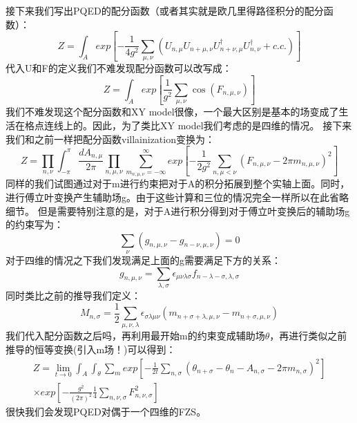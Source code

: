 \documentclass{article}
\begin{document}
接下来我们写出PQED的配分函数（或者其实就是欧几里得路径积分的配分函数）：
\begin{equation}
    Z = \int_A exp\left[ - \frac{1}{4 g^2} \sum_{\mu,\nu} \left(U_{n,\mu}U_{n+\mu,\nu}U_{n+\nu,\mu}^{\dagger} U_{n,\nu}^{\dagger} +c.c.\right)   \right] 
\end{equation}
代入U和F的定义我们不难发现配分函数可以改写成：
\begin{equation}
    Z = \int_A exp\left[ \frac{1}{g^2} \sum_{\mu,\nu} \cos(F_{n,\mu,\nu})  \right] 
\end{equation}
我们不难发现这个配分函数和XY model很像，一个最大区别是基本的场变成了生活在格点连线上的。因此，为了类比XY model我们考虑的是四维的情况。
接下来我们和之前一样把配分函数villainization变换为：
\begin{equation}
    Z = \prod_{n,\nu}\int_{- \pi}^{\pi}\frac{d A_{n,\mu}}{2 \pi} \prod_{n,\mu,\nu} \sum_{m_{n,\mu,\nu} = -\infty}^{\infty} exp\left[ - \frac{1}{2g^2}\sum_{n,\mu<\nu}\left(F_{n,\mu,\nu} - 2 \pi m_{n,\mu,\nu}\right)^2 \right] 
\end{equation}
同样的我们试图通过对于m进行约束把对于A的积分拓展到整个实轴上面。同时，进行傅立叶变换产生辅助场g。由于这些计算和三位的情况完全一样所以在此省略细节。
但是需要特别注意的是，对于A进行积分得到对于傅立叶变换后的辅助场g的约束写为：
\begin{equation}
    \sum_{\nu} \left(g_{n,\mu,\nu} - g_{n-\nu,\mu,\nu}\right) = 0 
\end{equation}
对于四维的情况之下我们发现满足上面的g需要满足下方的关系：
\begin{equation}
    g_{n,\mu,\nu} = \sum_{\lambda,\sigma}\epsilon_{\mu\nu\lambda\sigma} f_{n-\lambda-\sigma,\lambda,\sigma}
\end{equation}
同时类比之前的推导我们定义：
\begin{equation}
    M_{n,\sigma} = \frac{1}{2}\sum_{\mu,\nu,\lambda} \epsilon_{\sigma\lambda\mu\nu}\left(m_{n+\sigma+\lambda,\mu,\nu}- m_{n+\sigma,\mu,\nu}\right) 
\end{equation}
我们代入配分函数之后吗，再利用最开始m的约束变成辅助场$\theta$，再进行类似之前推导的恒等变换(引入m场！)可以得到：
\begin{equation}
    \begin{split}
        Z = \lim_{t \to 0} \int_A \int_{\theta} \sum_{m} exp\left[- \frac{1}{2t} \sum_{n,\sigma} \left(\theta_{n+\sigma} -\theta_n - A_{n,\sigma} - 2 \pi m_{n,\sigma}  \right)^2   \right] \\
        \times exp\left[- \frac{g^2}{(2\pi)^2} \frac{1}{4} \sum_{n,\nu,\sigma} F_{n,\nu,\sigma}^2   \right] 
    \end{split}
\end{equation}
很快我们会发现PQED对偶于一个四维的FZS。
\end{document}
